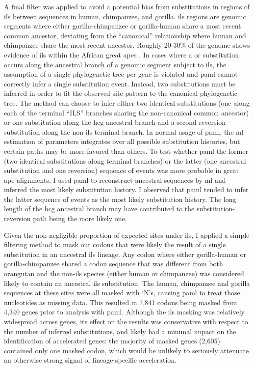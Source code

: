 A final filter was applied to avoid a potential bias from
substitutions in regions of \ac{ils} between sequences in human,
chimpanzee, and gorilla. \ac{ils} regions are genomic segments where
either gorilla-chimpanzee or gorilla-human share a most recent common
ancestor, deviating from the ``canonical'' relationship where human
and chimpanzee share the most recent ancestor. Roughly 20-30\% of the
genome shows evidence of \ac{ils} within the African great apes
\citep{Hobolth2007}. In cases where a \syn or \nsyn substitution
occurs along the ancestral branch of a genomic segment subject to
\ac{ils}, the assumption of a single phylogenetic tree per gene is
violated and \ac{paml} cannot correctly infer a single substitution
event. Instead, two substitutions must be inferred in order to fit the
observed site pattern to the canonical phylogenetic tree. The method
can choose to infer either two identical substitutions (one along each
of the terminal ``ILS'' branches sharing the non-canonical common
ancestor) or one substitution along the \ac{hcg} ancestral branch and
a second reversion substitution along the non-\ac{ils} terminal
branch. In normal usage of \ac{paml}, the \ac{ml} estimation of
parameters integrates over all possible substitution histories, but
certain paths may be more favored than others. To test whether
\ac{paml} the former (two identical substitutions along terminal
branches) or the latter (one ancestral substitution and one reversion)
sequence of events was more probable in great ape alignments, I used
\ac{paml} to reconstruct ancestral sequences by \ac{ml}
\citep{Yang1995} and inferred the most likely substitution history. I
observed that \ac{paml} tended to infer the latter sequence of events
as the most likely substitution history. The long length of the
\ac{hcg} ancestral branch may have contributed to the
substitution-reversion path being the more likely one.

Given the non-negligible proportion of expected sites under \ac{ils},
I applied a simple filtering method to mask out codons that were
likely the result of a single substitution in an ancestral \ac{ils}
lineage. Any codon where either gorilla-human or gorilla-chimpanzee
shared a codon sequence that was different from both orangutan and the
non-\ac{ils} species (either human or chimpanzee) was considered
likely to contain an ancestral \ac{ils} substitution. The human,
chimpanzee and gorilla sequences at these sites were all masked with
`N's, causing \ac{paml} to treat those nucleotides as missing
data. This resulted in 7,841 codons being masked from 4,340 genes
prior to analysis with \ac{paml}. Although the \ac{ils} masking was
relatively widespread across genes, its effect on the results was
conservative with respect to the number of inferred substitutions, and
likely had a minimal impact on the identification of accelerated
genes: the majority of masked genes (2,605) contained only one masked
codon, which would be unlikely to seriously attenuate an otherwise
strong signal of lineage-specific acceleration.

